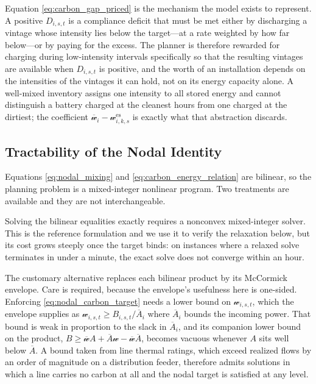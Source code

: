 Equation \eqref{eq:carbon_gap_priced} is the mechanism the model exists
to represent. A positive $D_{i,s,t}$ is a compliance deficit that must be
met either by discharging a vintage whose intensity lies below the
target---at a rate weighted by how far below---or by paying for the
excess. The planner is therefore rewarded for charging during
low-intensity intervals specifically so that the resulting vintages are
available when $D_{i,s,t}$ is positive, and the worth of an installation
depends on the intensities of the vintages it can hold, not on its energy
capacity alone. A well-mixed inventory assigns one intensity to all
stored energy and cannot distinguish a battery charged at the cleanest
hours from one charged at the dirtiest; the coefficient
$\overline{\mathscr{w}}_i-\mathscr{w}_{i,k,s}^{\mathrm{es}}$ is exactly
what that abstraction discards.

\subsection{Tractability of the Nodal Identity}
\label{sec:tractability}

Equations \eqref{eq:nodal_mixing} and \eqref{eq:carbon_energy_relation}
are bilinear, so the planning problem is a mixed-integer nonlinear
program. Two treatments are available and they are not interchangeable.

Solving the bilinear equalities exactly requires a nonconvex
mixed-integer solver. This is the reference formulation and we use it to
verify the relaxation below, but its cost grows steeply once the target
binds: on instances where a relaxed solve terminates in under a minute,
the exact solve does not converge within an hour.

The customary alternative replaces each bilinear product by its
McCormick envelope. Care is required, because the envelope's usefulness
here is one-sided. Enforcing \eqref{eq:nodal_carbon_target} needs a lower
bound on $\mathscr{w}_{i,s,t}$, which the envelope supplies as
$\mathscr{w}_{i,s,t}\geq B_{i,s,t}/\overline{A}_i$ where
$\overline{A}_i$ bounds the incoming power. That bound is weak in
proportion to the slack in $\overline{A}_i$, and its companion lower
bound on the product,
$B\geq\overline{\mathscr{w}}A+\overline{A}\mathscr{w}
-\overline{\mathscr{w}}\overline{A}$, becomes vacuous whenever $A$ sits
well below $\overline{A}$. A bound taken from line thermal ratings, which
exceed realized flows by an order of magnitude on a distribution feeder,
therefore admits solutions in which a line carries no carbon at all and
the nodal target is satisfied at any level.

